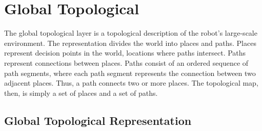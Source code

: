 \documentclass{article}
\begin{document}
\section{Global Topological}
The global topological layer is a topological description of the robot's large-scale environment. The representation
divides the world into places and paths. Places represent decision points in the world, locations where paths
intersect. Paths represent connections between places. Paths consist of an ordered sequence of path segments, where
each path segment represents the connection between two adjacent places. Thus, a path connects two or more places. The
topological map, then, is simply a set of places and a set of paths.

\subsection{Global Topological Representation}
\end{document}
